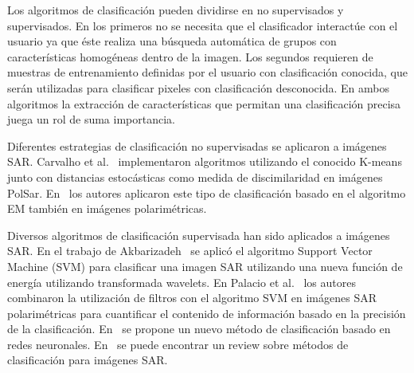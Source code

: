 \documentclass[11pt]{article}
\begin{document}
Los algoritmos de clasificación pueden dividirse en no supervisados y supervisados. En los primeros no se necesita que el clasificador interactúe con el usuario ya que éste realiza una búsqueda automática de grupos con características homogéneas dentro de la imagen. Los segundos requieren de muestras de entrenamiento definidas por el usuario con clasificación conocida, que serán utilizadas para clasificar pixeles con clasificación desconocida. En ambos algoritmos la extracción de características que permitan una clasificación precisa juega un rol de suma importancia.

Diferentes estrategias de clasificación no supervisadas se aplicaron a imágenes SAR. Carvalho et al.~\cite{Carvalho2019} implementaron algoritmos utilizando el conocido K-means junto con distancias estocásticas como medida de discimilaridad en imágenes PolSar. En~\cite{Fernandez2017} los autores aplicaron este tipo de clasificación basado en el algoritmo EM también en imágenes polarimétricas. 

Diversos algoritmos de clasificación supervisada han sido aplicados a imágenes SAR. En el trabajo de Akbarizadeh~\cite{Akbarizadeh2012} se aplicó el algoritmo Support Vector Machine (SVM) para clasificar una imagen SAR utilizando una nueva función de energía utilizando transformada wavelets. En Palacio et al.~\cite{Palacio2019} los autores combinaron la utilización de filtros con el algoritmo SVM en imágenes SAR polarimétricas para cuantificar el contenido de información basado en la precisión de la clasificación. En~\cite{Zhang2019} se propone un nuevo método de clasificación basado en redes neuronales. En~\cite{Parikh2020} se puede encontrar un review sobre métodos de clasificación para imágenes SAR.

\end{document}
